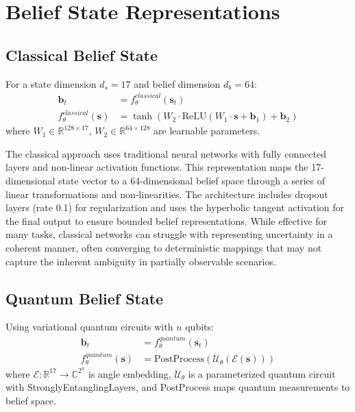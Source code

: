 \documentclass[11pt]{article}
\begin{document}
\section{Belief State Representations}

\subsection{Classical Belief State}
For a state dimension $d_s = 17$ and belief dimension $d_b = 64$:
\begin{align}
    \mathbf{b}_t &= f_{\theta}^{classical}(\mathbf{s}_t) \\
    f_{\theta}^{classical}(\mathbf{s}) &= \tanh(W_2 \cdot \text{ReLU}(W_1 \cdot \mathbf{s} + \mathbf{b}_1) + \mathbf{b}_2)
\end{align}
where $W_1 \in \mathbb{R}^{128 \times 17}$, $W_2 \in \mathbb{R}^{64 \times 128}$ are learnable parameters.

The classical approach uses traditional neural networks with fully connected layers and non-linear activation functions. This representation maps the 17-dimensional state vector to a 64-dimensional belief space through a series of linear transformations and non-linearities. The architecture includes dropout layers (rate 0.1) for regularization and uses the hyperbolic tangent activation for the final output to ensure bounded belief representations. While effective for many tasks, classical networks can struggle with representing uncertainty in a coherent manner, often converging to deterministic mappings that may not capture the inherent ambiguity in partially observable scenarios.

\subsection{Quantum Belief State}
Using variational quantum circuits with $n$ qubits:
\begin{align}
    \mathbf{b}_t &= f_{\theta}^{quantum}(\mathbf{s}_t) \\
    f_{\theta}^{quantum}(\mathbf{s}) &= \text{PostProcess}(\mathcal{U}_{\theta}(\mathcal{E}(\mathbf{s})))
\end{align}
where $\mathcal{E}: \mathbb{R}^{17} \rightarrow \mathbb{C}^{2^n}$ is angle embedding, $\mathcal{U}_{\theta}$ is a parameterized quantum circuit with StronglyEntanglingLayers, and PostProcess maps quantum measurements to belief space.
\end{document}

